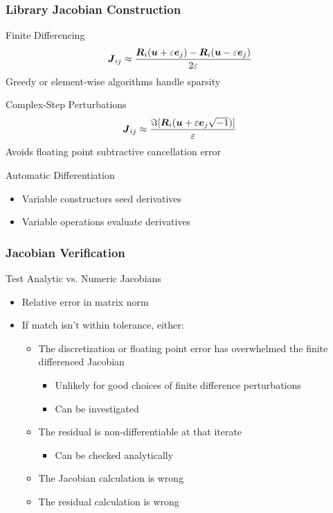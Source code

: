 \begin{frame}
\frametitle{Library Jacobian Construction}
\begin{block}{Finite Differencing}
\begin{equation*}
{\boldsymbol{J}}_{ij} \approx \frac{{\boldsymbol{R}}_i({\boldsymbol{u}} + \varepsilon {\boldsymbol{e}}_j) -
{\boldsymbol{R}}_i({\boldsymbol{u}} - \varepsilon {\boldsymbol{e}}_j)}{2 \varepsilon}
\end{equation*}
Greedy or element-wise algorithms handle sparsity
\end{block}
\begin{block}{Complex-Step Perturbations}
\begin{equation*}
{\boldsymbol{J}}_{ij} \approx \frac{\Im[{\boldsymbol{R}}_i({\boldsymbol{u}} + \varepsilon
{\boldsymbol{e}}_j \sqrt{-1})]}{\varepsilon}
\end{equation*}
Avoids floating point subtractive cancellation error
\end{block}
\begin{block}{Automatic Differentiation}
\begin{itemize}
\item Variable constructors seed derivatives
\item Variable operations evaluate derivatives
\end{itemize}
\end{block}
\end{frame}

\begin{frame}
\frametitle{Jacobian Verification}
\begin{block}{Test Analytic vs. Numeric Jacobians}
\begin{itemize}
\item Relative error in matrix norm
\item If match isn't within tolerance, either:
\begin{itemize}
\item The discretization or floating point error has overwhelmed the
finite differenced Jacobian 
\begin{itemize}
\item Unlikely for good choices of finite difference perturbations
\item Can be investigated
\end{itemize}
\item The residual is non-differentiable at that iterate
\begin{itemize}
\item Can be checked analytically
\end{itemize}
\item The Jacobian calculation is wrong
\item The residual calculation is wrong
\end{itemize}
\end{itemize}
\end{block}

\end{frame}

